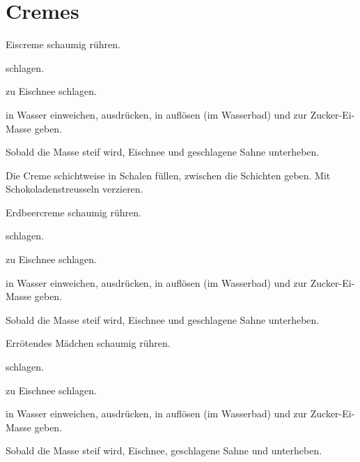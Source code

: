 \section{Cremes}

\begin{recipe}{Eiscreme}
  schaumig rühren.

  schlagen.
  
  zu Eischnee schlagen.

  in Wasser einweichen, ausdrücken, in
  auflösen (im Wasserbad) und zur Zucker-Ei-Masse geben.

  Sobald die Masse steif wird, Eischnee und geschlagene Sahne
  unterheben.

  Die Creme schichtweise in Schalen füllen, zwischen die Schichten
  geben. Mit Schokoladenstreusseln verzieren.
\end{recipe}



\begin{recipe}{Erdbeercreme}
  schaumig rühren.

  schlagen.
  
  zu Eischnee schlagen.

  in Wasser einweichen, ausdrücken, in
  auflösen (im Wasserbad) und zur Zucker-Ei-Masse geben.

  Sobald die Masse steif wird, Eischnee und geschlagene Sahne
  unterheben.
\end{recipe}



\begin{recipe}{Errötendes Mädchen}
  schaumig rühren.

  schlagen.
  
  zu Eischnee schlagen.

  in Wasser einweichen, ausdrücken, in
  auflösen (im Wasserbad) und zur Zucker-Ei-Masse geben.

  Sobald die Masse steif wird, Eischnee, geschlagene Sahne und
  unterheben.
\end{recipe}




